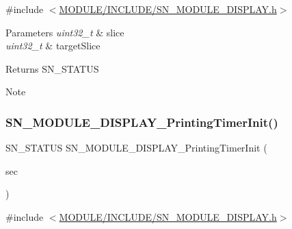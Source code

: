 {\ttfamily \#include $<$\hyperlink{SN__MODULE__DISPLAY_8h}{M\+O\+D\+U\+L\+E/\+I\+N\+C\+L\+U\+D\+E/\+S\+N\+\_\+\+M\+O\+D\+U\+L\+E\+\_\+\+D\+I\+S\+P\+L\+A\+Y.\+h}$>$}


\begin{DoxyParams}{Parameters}
{\em uint32\+\_\+t} & slice \\
\hline
{\em uint32\+\_\+t} & target\+Slice \\
\hline
\end{DoxyParams}
\begin{DoxyReturn}{Returns}
S\+N\+\_\+\+S\+T\+A\+T\+US 
\end{DoxyReturn}
\begin{DoxyNote}{Note}

\end{DoxyNote}
\mbox{\label{group__DISPLAY_gac630c6bd386295f3008bc04e8b9c92a0}} 
\subsubsection{\texorpdfstring{S\+N\+\_\+\+M\+O\+D\+U\+L\+E\+\_\+\+D\+I\+S\+P\+L\+A\+Y\+\_\+\+Printing\+Timer\+Init()}{SN\_MODULE\_DISPLAY\_PrintingTimerInit()}}
{\footnotesize\ttfamily S\+N\+\_\+\+S\+T\+A\+T\+US S\+N\+\_\+\+M\+O\+D\+U\+L\+E\+\_\+\+D\+I\+S\+P\+L\+A\+Y\+\_\+\+Printing\+Timer\+Init (\begin{DoxyParamCaption}\item[{uint32\+\_\+t}]{sec }\end{DoxyParamCaption})}



{\ttfamily \#include $<$\hyperlink{SN__MODULE__DISPLAY_8h}{M\+O\+D\+U\+L\+E/\+I\+N\+C\+L\+U\+D\+E/\+S\+N\+\_\+\+M\+O\+D\+U\+L\+E\+\_\+\+D\+I\+S\+P\+L\+A\+Y.\+h}$>$}


